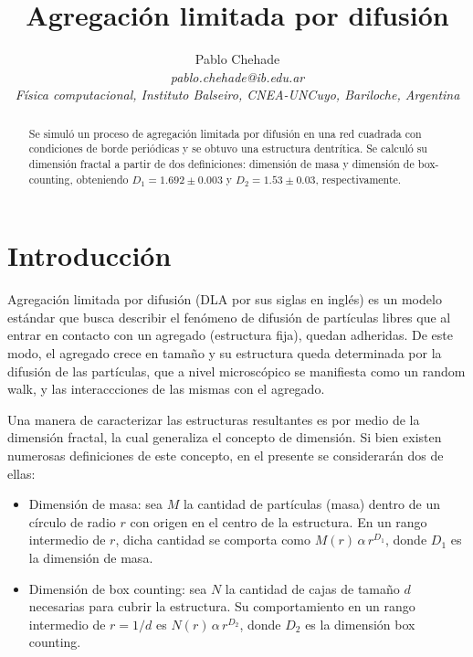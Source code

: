 \documentclass[aps,prb,twocolumn,superscriptaddress,floatfix,longbibliography]{revtex4-2}
\newcounter{para}
\begin{document}
\newcommand{\mytitle}{Agregación limitada por difusión}

\title{\mytitle}

\author{Pablo Chehade \\
    \small \textit{pablo.chehade@ib.edu.ar} \\
    \small \textit{Física computacional, Instituto Balseiro, CNEA-UNCuyo, Bariloche, Argentina} \\}



\begin{abstract}

Se simuló un proceso de agregación limitada por difusión en una red cuadrada con condiciones de borde periódicas y se obtuvo una estructura dentrítica. Se calculó su dimensión fractal a partir de dos definiciones: dimensión de masa y dimensión de box-counting, obteniendo $D_1 = 1.692 \pm 0.003$ y $D_2 = 1.53 \pm 0.03$, respectivamente.

\end{abstract}

\maketitle


\section{Introducción}

Agregación limitada por difusión (DLA por sus siglas en inglés) es un modelo estándar que busca describir el fenómeno de difusión de partículas libres que al entrar en contacto con un agregado (estructura fija), quedan adheridas. De este modo, el agregado crece en tamaño y su estructura queda determinada por la difusión de las partículas, que a nivel microscópico se manifiesta como un random walk, y las interaccciones de las mismas con el agregado. 

Una manera de caracterizar las estructuras resultantes es por medio de la dimensión fractal, la cual generaliza el concepto de dimensión. Si bien existen numerosas definiciones de este concepto, en el presente se considerarán dos de ellas:
\begin{itemize}
    \item Dimensión de masa: sea $M$ la cantidad de partículas (masa) dentro de un círculo de radio $r$ con origen en el centro de la estructura. En un rango intermedio de $r$, dicha cantidad se comporta como $M(r) \, \alpha \, r^{D_1}$, donde $D_1$ es la dimensión de masa.
    \item Dimensión de box counting: sea $N$ la cantidad de cajas de tamaño $d$ necesarias para cubrir la estructura. Su comportamiento en un rango intermedio de $r = 1/d$ es $N(r) \, \alpha \, r^{D_2}$, donde $D_2$ es la dimensión box counting.
\end{itemize}
\end{document}
